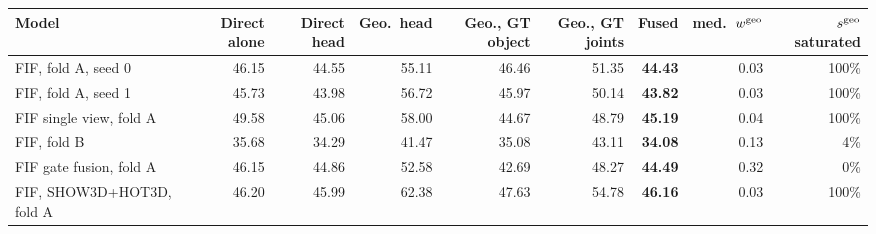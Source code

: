 \footnotesize\setlength{\tabcolsep}{3.5pt}
\begin{tabular}{@{}lrrrrrrrr@{}}
\toprule
Model & Direct alone & Direct head & Geo.\ head & Geo., GT object & Geo., GT joints & Fused & med.\ $w^{\rm geo}$ & $s^{\rm geo}$ saturated \\
\midrule
FIF, fold A, seed 0 & 46.15 & 44.55 & 55.11 & 46.46 & 51.35 & \textbf{44.43} & 0.03 & 100\% \\
FIF, fold A, seed 1 & 45.73 & 43.98 & 56.72 & 45.97 & 50.14 & \textbf{43.82} & 0.03 & 100\% \\
FIF single view, fold A & 49.58 & 45.06 & 58.00 & 44.67 & 48.79 & \textbf{45.19} & 0.04 & 100\% \\
FIF, fold B & 35.68 & 34.29 & 41.47 & 35.08 & 43.11 & \textbf{34.08} & 0.13 & 4\% \\
FIF gate fusion, fold A & 46.15 & 44.86 & 52.58 & 42.69 & 48.27 & \textbf{44.49} & 0.32 & 0\% \\
FIF, SHOW3D+HOT3D, fold A & 46.20 & 45.99 & 62.38 & 47.63 & 54.78 & \textbf{46.16} & 0.03 & 100\% \\
\bottomrule
\end{tabular}
